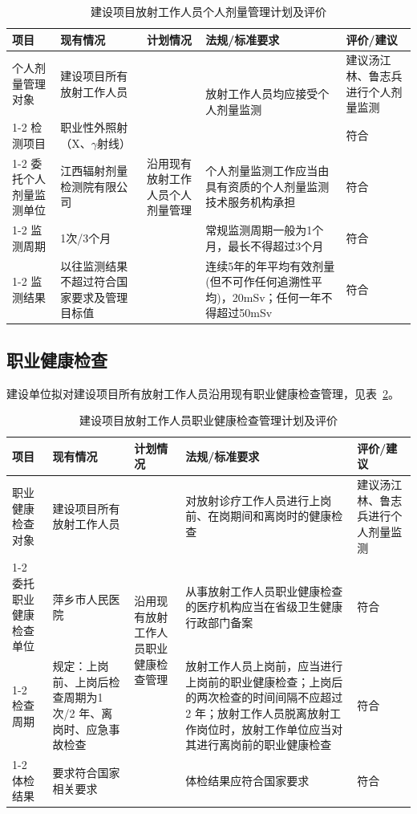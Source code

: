 \begin{table}[H]
\centering
\caption{建设项目放射工作人员个人剂量管理计划及评价}\label{tab:8-3}
\begin{tabular}{
|m{1.8cm}|m{2.4cm}|m{1.8cm}|m{5.2cm}|m{2.2cm}|
}
\hline
项目 & 现有情况 & 计划情况 & 法规/标准要求 & 评价/建议 \\
\hline
个人剂量管理对象
& 建设项目所有放射工作人员
& \multirow{5}{=}{沿用现有放射工作人员个人剂量管理}
& \multirow{2}{=}{放射工作人员均应接受个人剂量监测}
& 建议汤江林、鲁志兵进行个人剂量监测 \\
\cline{1-2}\cline{5-5}
检测项目
& 职业性外照射（X、$\gamma$射线）
&
&
& 符合 \\
\cline{1-2}\cline{4-5}
委托个人剂量监测单位
& 江西辐射剂量检测院有限公司
&
& 个人剂量监测工作应当由具有资质的个人剂量监测技术服务机构承担
& 符合 \\
\cline{1-2}\cline{4-5}
监测周期
& 1次/3个月
&
& 常规监测周期一般为1个月，最长不得超过3个月
& 符合 \\
\cline{1-2}\cline{4-5}
监测结果
& 以往监测结果不超过符合国家要求及管理目标值
&
& 连续5年的年平均有效剂量(但不可作任何追溯性平均)，20mSv；任何一年不得超过50mSv
& 符合 \\
\hline
\end{tabular}
\end{table}


\subsection{职业健康检查}

建设单位拟对建设项目所有放射工作人员沿用现有职业健康检查管理，见表~\ref{tab:ch8-3-t4-c29f11e5}。


\begin{table}[H]
\centering
\caption{建设项目放射工作人员职业健康检查管理计划及评价}
\label{tab:ch8-3-t4-c29f11e5}
\begin{tabular}{
|m{1.8cm}|m{2.4cm}|m{1.8cm}|m{5.2cm}|m{2.2cm}|
}
\hline
项目 & 现有情况 & 计划情况 & 法规/标准要求 & 评价/建议 \\
\hline
职业健康检查对象
& 建设项目所有放射工作人员
& \multirow{5}{=}{沿用现有放射工作人员职业健康检查管理}
& 对放射诊疗工作人员进行上岗前、在岗期间和离岗时的健康检查
& 建议汤江林、鲁志兵进行个人剂量监测 \\
\cline{1-2}\cline{4-5}
委托职业健康检查单位
& 萍乡市人民医院
&
& 从事放射工作人员职业健康检查的医疗机构应当在省级卫生健康行政部门备案
& 符合 \\
\cline{1-2}\cline{4-5}
检查周期
& 规定：上岗前、上岗后检查周期为1 次/2 年、离岗时、应急事故检查
&
& 放射工作人员上岗前，应当进行上岗前的职业健康检查；上岗后的两次检查的时间间隔不应超过 2 年；放射工作人员脱离放射工作岗位时，放射工作单位应当对其进行离岗前的职业健康检查
& 符合 \\
\cline{1-2}\cline{4-5}
体检结果
& 要求符合国家相关要求
&
& 体检结果应符合国家要求
& 符合 \\
\hline
\end{tabular}
\end{table}



